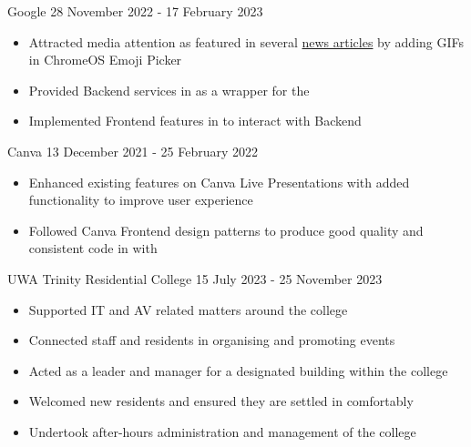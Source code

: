 \documentclass[paper=a4,fontsize=9pt]{resume}
\begin{document}
{	\divider

		{Google}
		{28 November 2022 - 17 February 2023}
	\begin{itemize}
		\item Attracted media attention as featured in several \href{https://chromeunboxed.com/gif-support-chromebook-chrome-os-emoji-picker/}{news articles} by adding GIFs in ChromeOS Emoji Picker
		\item Provided Backend services in  as a wrapper for the 
		\item Implemented Frontend features in  to interact with Backend
	\end{itemize}

	\divider

		{Canva}
		{13 December 2021 - 25 February 2022}
	\begin{itemize}
		\item Enhanced existing features on Canva Live Presentations with added functionality to improve user experience
		\item Followed Canva Frontend design patterns to produce good quality and consistent code in  with 
	\end{itemize}

	\divider

		{UWA Trinity Residential College}
		{15 July 2023 - 25 November 2023}
	\begin{itemize}
		\item Supported IT and AV related matters around the college
		\item Connected staff and residents in organising and promoting events
		\item Acted as a leader and manager for a designated building within the college
		\item Welcomed new residents and ensured they are settled in comfortably
		\item Undertook after-hours administration and management of the college
	\end{itemize}



}
\end{document}
